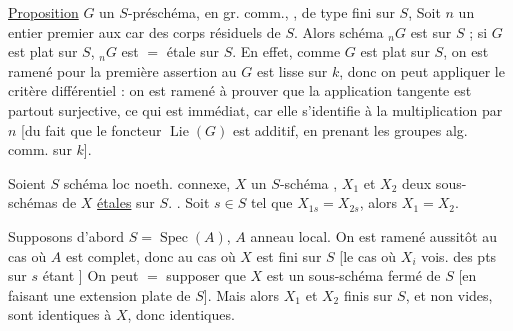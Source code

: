 \uline{Proposition} $G$ un $S$-préschéma, en gr.  comm., , de type fini sur $S$,  Soit $n$ un entier  premier aux car des corps résiduels de $S$. Alors   schéma $ {}_nG$ est  sur $S$ ;  si $G$ est plat sur $S$, $ {}_nG$ est $=$ étale sur $S$.
En effet, comme $G$ est plat sur $S$, on est ramené pour la première assertion au 
  $G$ est lisse sur $k$, donc on peut  appliquer le critère différentiel : on est ramené à prouver que la  application tangente est partout surjective, ce qui est immédiat, car elle s'identifie à la multiplication par $n$ [du fait que le foncteur $\operatorname{Lie}(G)$ est additif, en prenant les groupes alg. comm. sur $k$].

 Soient $S$ schéma  loc noeth. connexe, $X$ un  $S$-schéma , $X_1$ et $X_2$ deux sous-schémas  de $X$ \uline{étales}  sur $S$. . Soit $s\in S$ tel que $X_{1s}=X_{2s}$, alors $X_1=X_2$.


Supposons d'abord $S=\operatorname{Spec}(A)$, $A$ anneau local. On est ramené aussitôt au cas où $A$ est complet, donc  \deleted{et schémas \unsure{éloignés} de la fibre pt sur $s$]} au cas où $X$ est fini sur $S$ [le cas où $X_i$   vois. des pts sur $s$ étant ]
On peut $=$ supposer que $X$ est un sous-schéma fermé de $S$ [en faisant une extension   plate de $S$]. Mais alors $X_1$ et $X_2$  finis  sur $S$, et non vides, sont identiques à $X$, donc identiques. 

